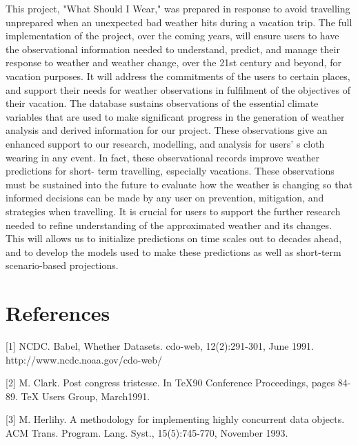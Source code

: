 \documentclass{sig-alternate}
\begin{document}
	This project, "What Should I Wear," was prepared in response to avoid travelling unprepared when an 		unexpected bad weather hits during a vacation trip. The full implementation of the project, over the 	coming years, will ensure users to have the observational information needed to understand, predict, 	and manage their response to weather and weather change, over the 21st century and beyond, for 			vacation purposes. It will address the commitments of the users to certain places, and support 			their needs for weather observations in fulfilment of the objectives of their vacation. The 				database sustains observations of the essential climate variables that are used to make significant 		progress in the generation of weather analysis and derived information for our project. These 			observations give an enhanced support to our research, modelling, and analysis for users' s cloth 		wearing in any event. In fact, these observational records improve weather predictions for short-			term travelling, especially vacations. These observations must be sustained into the future to 			evaluate how the weather is changing so that informed decisions can be made by any user on 				prevention, mitigation, and strategies when travelling. It is crucial for users to support the 			further research needed to refine understanding of the approximated weather and its changes. This 		will allows us to initialize predictions on time scales out to decades ahead, and to develop the 			models used to make these predictions as well as short-term scenario-based projections.

\section{References}

	[1] NCDC. Babel, Whether Datasets. cdo-web,
		12(2):291-301, June 1991.
		http://www.ncdc.noaa.gov/cdo-web/
		\newline

	[2] M. Clark. Post congress tristesse. In TeX90 Conference
		Proceedings, pages 84-89. TeX Users Group, March1991.
		\newline

	[3] M. Herlihy. A methodology for implementing highly
		concurrent data objects. ACM Trans. Program. Lang.
		Syst., 15(5):745-770, November 1993.
		\newline
\end{document}
